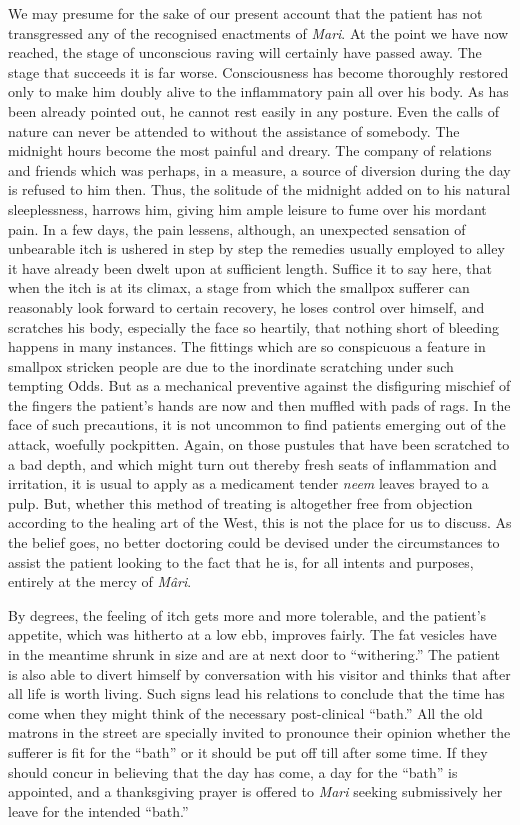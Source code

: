 \documentclass[a4paper, 12pt, oneside, english, twocolumn]{article}
\begin{document}
We may presume for the sake of our present account that the patient has not transgressed any of the recognised enactments of \emph{Mari}. At the point we have now reached, the stage of unconscious raving will certainly have passed away. The stage that succeeds it is far worse. Consciousness has become thoroughly restored only to make him doubly alive to the inflammatory pain all over his body. As has been already pointed out, he cannot rest easily in any posture. Even the calls of nature can never be attended to without the assistance of somebody. The midnight hours become the most painful and dreary. The company of relations and friends which was perhaps, in a measure, a source of diversion during the day is refused to him then. Thus, the solitude of the midnight added on to his natural sleeplessness, harrows him, giving him ample leisure to fume over his mordant pain. In a few days, the pain lessens, although, an unexpected sensation of unbearable itch is ushered in step by step the remedies usually employed to alley it have already been dwelt upon at sufficient length. Suffice it to say here, that when the itch is at its climax, a stage from which the smallpox sufferer can reasonably look forward to certain recovery, he loses control over himself, and scratches his body, especially the face so heartily, that nothing short of bleeding happens in many instances. The fittings which are so conspicuous a feature in smallpox stricken people are due to the inordinate scratching under such tempting Odds. But as a mechanical preventive against the disfiguring mischief of the fingers the patient's hands are now and then muffled with pads of rags. In the face of such precautions, it is not uncommon to find patients emerging out of the attack, woefully pockpitten. Again, on those pustules that have been scratched to a bad depth, and which might turn out thereby fresh seats of inflammation and irritation, it is usual to apply as a medicament tender \emph{neem} leaves brayed to a pulp. But, whether this method of treating is altogether free from objection according to the healing art of the West, this is not the place for us to discuss. As the belief goes, no better doctoring could be devised under the circumstances to assist the patient looking to the fact that he is, for all intents and purposes, entirely at the mercy of \emph{Mâri}.

By degrees, the feeling of itch gets more and more tolerable, and the patient's appetite, which was hitherto at a low ebb, improves fairly. The fat vesicles have in the meantime shrunk in size and are at next door to ``withering.'' The patient is also able to divert himself by conversation with his visitor and thinks that after all life is worth living. Such signs lead his relations to conclude that the time has come when they might think of the necessary post-clinical ``bath.'' All the old matrons in the street are specially invited to pronounce their opinion whether the sufferer is fit for the ``bath'' or it should be put off till after some time. If they should concur in believing that the day has come, a day for the ``bath'' is appointed, and a thanksgiving prayer is offered to \emph{Mari} seeking submissively her leave for the intended ``bath.''
\end{document}
